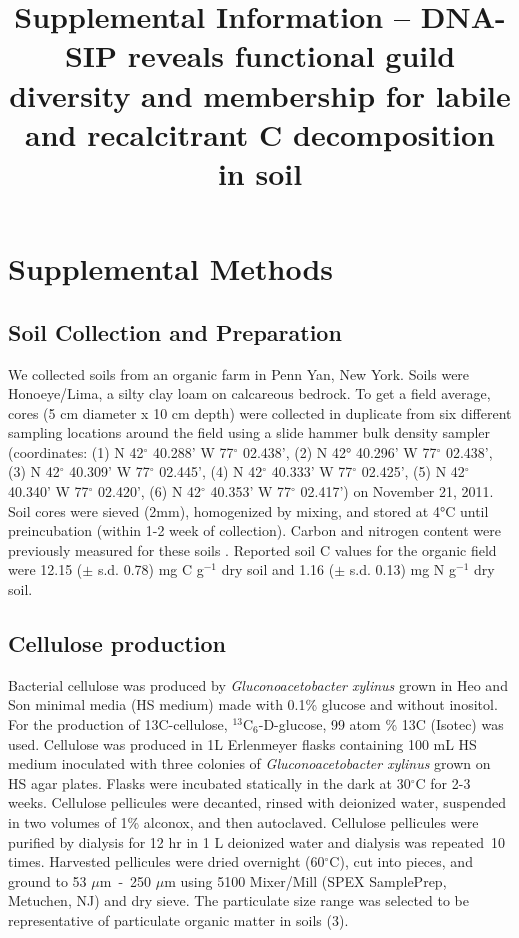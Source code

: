 \documentclass{article}
\title{Supplemental Information -- DNA-SIP reveals functional guild
diversity and membership for labile and recalcitrant C decomposition in
soil}
\date{\vspace{-5ex}}
\begin{document}
\maketitle

\tableofcontents



\section{Supplemental Methods}\label{SI} 

\subsection{Soil Collection and Preparation} 
We collected soils from an organic farm in Penn Yan, New York. Soils were
Honoeye/Lima, a silty clay loam on calcareous bedrock. To get a field average,
cores (5 cm diameter x 10 cm depth) were collected in duplicate from six
different sampling locations around the field using a slide hammer bulk density
sampler (coordinates: (1) N 42$^{\circ}$ 40.288’ W 77$^{\circ}$ 02.438’, (2)
N 42° 40.296’ W 77$^{\circ}$
02.438’, (3) N 42$^{\circ}$ 40.309’ W 77$^{\circ}$ 02.445’, (4) N 42$^{\circ}$
40.333’ W 77$^{\circ}$ 02.425’, (5) N 42$^{\circ}$ 40.340’ W 77$^{\circ}$
02.420’, (6) N 42$^{\circ}$ 40.353’ W 77$^{\circ}$ 02.417’) on November 21,
2011. Soil cores were sieved (2mm), homogenized by mixing, and
stored at 4°C until preincubation (within 1-2 week of collection).
Carbon and nitrogen content were previously measured for these soils
\citep{Berthrong_2013}. Reported soil C values for the organic field were
12.15 ($\pm$ s.d. 0.78) mg C g$^{-1}$ dry soil and 1.16 ($\pm$ s.d. 0.13)
mg N g$^{-1}$ dry soil. 

\subsection{Cellulose production}
Bacterial cellulose was produced by \textit{Gluconoacetobacter xylinus} grown
in Heo and Son \citep{Heo_2002} minimal media (HS medium) made with 0.1\%
glucose and without inositol.  For the production of 13C-cellulose,
$^{13}$C$_{6}$-D-glucose, 99 atom \% 13C (Isotec) was used. Cellulose was
produced in 1L Erlenmeyer flasks containing 100 mL HS medium inoculated with
three colonies of \textit{Gluconoacetobacter xylinus} grown on HS agar plates.
Flasks were incubated statically in the dark at 30$^{\circ}$C for 2-3 weeks.
Cellulose pellicules were decanted, rinsed with deionized water, suspended in
two volumes of 1\% alconox, and then autoclaved. Cellulose pellicules were
purified by dialysis for 12 hr in 1 L deionized water and dialysis was
repeated~10 times. Harvested pellicules were dried overnight (60$^{\circ}$C),
cut into pieces, and ground to 53 $\mu$m~-~250 $\mu$m using 5100 Mixer/Mill (SPEX
SamplePrep, Metuchen, NJ) and dry sieve. The particulate size range was
selected to be representative of particulate organic matter in soils (3).
\end{document}
